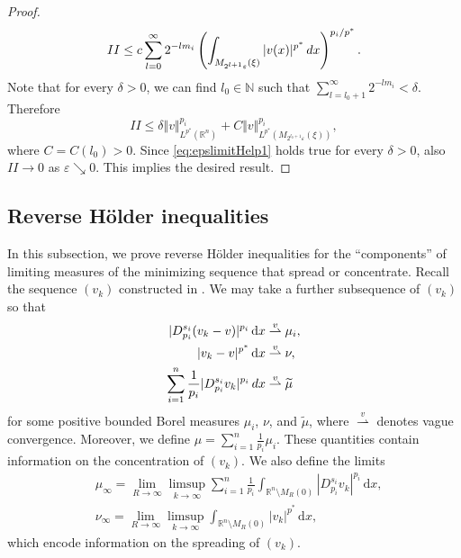 \documentclass[11pt]{amsart}
\theoremstyle{plain}
\theoremstyle{definition}
\numberwithin{equation}{section}
\renewcommand{\d}{\textnormal{d}}
\newcommand{\N}{\mathbb{N}}
\newcommand{\R}{\mathbb{R}}
\newcommand{\eps}{\varepsilon}
\begin{document}
\begin{proof}
\begin{equation*}
II \le c \sum_{l = 0}^{\infty} 2^{-l m_i} \left(\int_{M_{2^{l+1}\eps}(\xi)} \vert v(x) \vert^{p^{\ast}} \, \d x \right)^{p_i /p^{\ast}}.
\end{equation*}
Note that for every $\delta > 0$, we can find $l_0 \in \N$ such that $\sum_{l = l_0+1}^{\infty} 2^{-l m_i} < \delta$. Therefore
\begin{equation}
\label{eq:epslimitHelp1}
II \le \delta \Vert v \Vert_{L^{p^{\ast}}(\R^n)}^{p_i} + C\Vert v \Vert_{L^{p^{\ast}}\left(M_{2^{l_0+1}\eps}(\xi)\right)}^{p_i},
\end{equation}
where $C = C(l_0) > 0$. Since \eqref{eq:epslimitHelp1} holds true for every $\delta > 0$, also $II \to 0$ as $\eps \searrow 0$. This implies the desired result. 
\end{proof}

\subsection{Reverse H\"older inequalities}\label{ssec:reverse}

In this subsection, we prove reverse H\"older inequalities for the ``components'' of limiting measures of the minimizing sequence that spread or concentrate. 
Recall the sequence $(v_k)$ constructed in . We may take a further subsequence of $(v_k)$ so that
\begin{align*}
|D^{s_i}_{p_i} (v_k-v)|^{p_i} \,\mathrm{d}x &\overset{v}{\rightharpoonup} \mu_i,\\
|v_k-v|^{p^{\ast}} \,\mathrm{d}x &\overset{v}{\rightharpoonup} \nu,\\
\sum_{i =1}^n \frac{1}{p_i}\vert D_{p_i}^{s_i} v_k\vert^{p_i}\, \d x &\overset{v}{\rightharpoonup} \widetilde{\mu}
\end{align*}
for some positive bounded Borel measures $\mu_i$, $\nu$, and $\widetilde{\mu}$,  where $\overset{v}{\rightharpoonup}$ denotes vague convergence. 
Moreover, we define $\mu = \sum_{i=1}^n \frac{1}{p_i} \mu_i$. These quantities contain information on the concentration of $(v_k)$.
We also define the limits
\begin{equation*}
\begin{split}
&\mu_{\infty} = \lim_{R \to \infty} \limsup_{k\to\infty} \sum_{i=1}^n \frac{1}{p_i} \int_{\R^n \setminus M_R(0)} |D^{s_i}_{p_i} v_k|^{p_i} \,\mathrm{d}x, \\
&\nu_{\infty} = \lim_{R \to \infty} \limsup_{k\to\infty} \int_{\R^n \setminus M_R(0)} |v_k|^{p^{\ast}} \,\mathrm{d}x,
\end{split}
\end{equation*}
which encode information on the spreading of $(v_k)$. 
\end{document}
